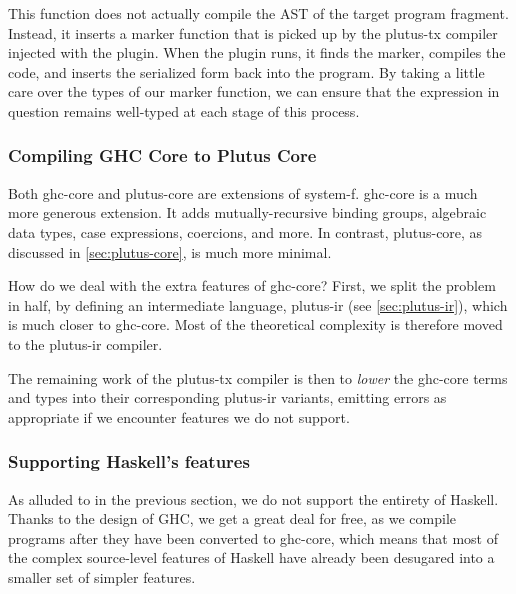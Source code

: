 This function does not actually compile the AST of the target program fragment.
Instead, it inserts a marker function that is picked up by the \gls{plutus-tx} compiler injected with the plugin.
When the plugin runs, it finds the marker, compiles the code, and inserts the serialized form back into the program.
By taking a little care over the types of our marker function, we can ensure that the expression in question remains well-typed at each stage of this process.

\subsubsection{Compiling GHC Core to Plutus Core}

Both \gls{ghc-core} and \gls{plutus-core} are extensions of \gls{system-f}.
\Gls{ghc-core} is a much more generous extension.
It adds mutually-recursive binding groups, algebraic data types, case expressions, coercions, and more.
In contrast, \gls{plutus-core}, as discussed in \cref{sec:plutus-core}, is much more minimal.

How do we deal with the extra features of \gls{ghc-core}?
First, we split the problem in half, by defining an intermediate language, \gls{plutus-ir} (see \cref{sec:plutus-ir}), which is much closer to \gls{ghc-core}.
Most of the theoretical complexity is therefore moved to the \gls{plutus-ir} compiler.

The remaining work of the \gls{plutus-tx} compiler is then to \emph{lower} the \gls{ghc-core} terms and types into their corresponding \gls{plutus-ir} variants, emitting errors as appropriate if we encounter features we do not support.

\subsubsection{Supporting Haskell's features}

As alluded to in the previous section, we do not support the entirety of Haskell.
Thanks to the design of GHC, we get a great deal for free, as we compile programs after they have been converted to \gls{ghc-core}, which means that most of the complex source-level features of Haskell have already been desugared into a smaller set of simpler features.

